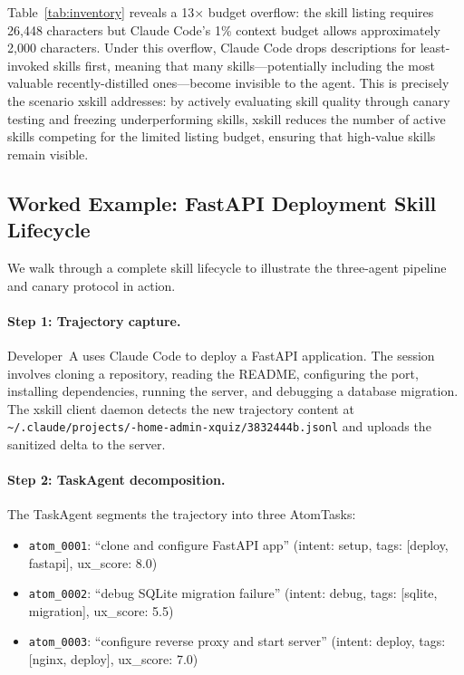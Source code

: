 \documentclass[11pt]{article}
\begin{document}
Table~\ref{tab:inventory} reveals a 13$\times$ budget overflow: the skill listing requires 26,448 characters but Claude Code's 1\% context budget allows approximately 2,000 characters. Under this overflow, Claude Code drops descriptions for least-invoked skills first, meaning that many skills---potentially including the most valuable recently-distilled ones---become invisible to the agent. This is precisely the scenario xskill addresses: by actively evaluating skill quality through canary testing and freezing underperforming skills, xskill reduces the number of active skills competing for the limited listing budget, ensuring that high-value skills remain visible.

\subsection{Worked Example: FastAPI Deployment Skill Lifecycle}

We walk through a complete skill lifecycle to illustrate the three-agent pipeline and canary protocol in action.

\paragraph{Step 1: Trajectory capture.} Developer~A uses Claude Code to deploy a FastAPI application. The session involves cloning a repository, reading the README, configuring the port, installing dependencies, running the server, and debugging a database migration. The xskill client daemon detects the new trajectory content at \texttt{\~{}/.claude/projects/-home-admin-xquiz/\allowbreak 3832444b.jsonl} and uploads the sanitized delta to the server.

\paragraph{Step 2: TaskAgent decomposition.} The TaskAgent segments the trajectory into three AtomTasks:
\begin{itemize}
    \item \texttt{atom\_0001}: ``clone and configure FastAPI app'' (intent: setup, tags: [deploy, fastapi], ux\_score: 8.0)
    \item \texttt{atom\_0002}: ``debug SQLite migration failure'' (intent: debug, tags: [sqlite, migration], ux\_score: 5.5)
    \item \texttt{atom\_0003}: ``configure reverse proxy and start server'' (intent: deploy, tags: [nginx, deploy], ux\_score: 7.0)
\end{itemize}
\end{document}
